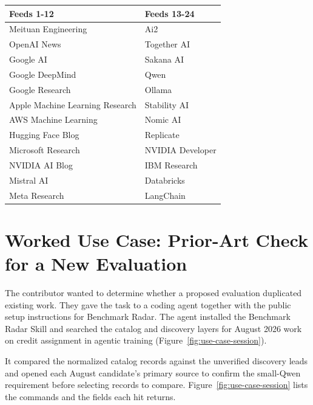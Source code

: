 \documentclass[11pt]{article}
\begin{document}
\begin{center}
\centering
\small
\begin{tabularx}{\textwidth}{Y Y}
\toprule
\textbf{Feeds 1-12} & \textbf{Feeds 13-24}\\
\midrule
Meituan Engineering & Ai2\\
OpenAI News & Together AI\\
Google AI & Sakana AI\\
Google DeepMind & Qwen\\
Google Research & Ollama\\
Apple Machine Learning Research & Stability AI\\
AWS Machine Learning & Nomic AI\\
Hugging Face Blog & Replicate\\
Microsoft Research & NVIDIA Developer\\
NVIDIA AI Blog & IBM Research\\
Mistral AI & Databricks\\
Meta Research & LangChain\\
\bottomrule
\end{tabularx}
\label{tab:first-party-feeds}
\end{center}

\section{Worked Use Case: Prior-Art Check for a New Evaluation}
\label{app:use-case}

The contributor wanted to determine whether a proposed evaluation duplicated existing work. They gave the task to a coding agent together with the public setup instructions for Benchmark Radar. The agent installed the Benchmark Radar Skill and searched the catalog and discovery layers for August 2026 work on credit assignment in agentic training (Figure~\ref{fig:use-case-session}).

It compared the normalized catalog records against the unverified discovery leads and opened each August candidate's primary source to confirm the small-Qwen requirement before selecting records to compare. Figure~\ref{fig:use-case-session} lists the commands and the fields each hit returns.

\begin{center}
\resizebox{0.98\textwidth}{!}{}
\label{fig:use-case-session}
\end{center}
\end{document}
